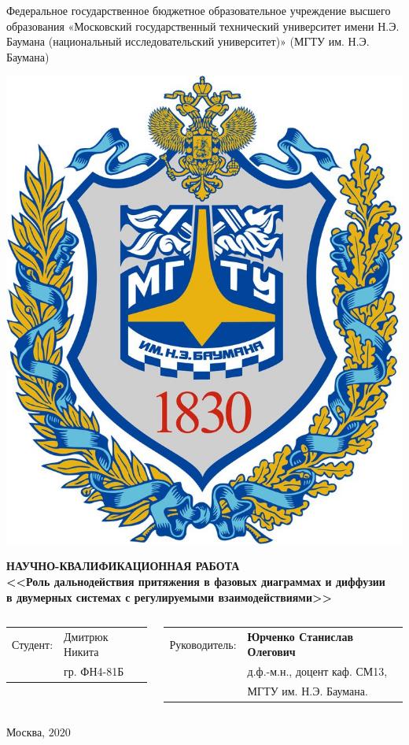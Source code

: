 \documentclass[pdf,hyperref={unicode}]{beamer}
\begin{document}

\begin{frame}
	\begin{center}\tiny
		Федеральное государственное бюджетное образовательное учреждение высшего образования «Московский государственный технический университет имени Н.Э. Баумана (национальный исследовательский университет)» (МГТУ им. Н.Э. Баумана)\\
    \end{center}

	\begin{center}
		\includegraphics[width=0.15\linewidth]{emb}
	\end{center}

	\begin{center}
\tiny \textbf{НАУЧНО-КВАЛИФИКАЦИОННАЯ РАБОТА}\\
\tiny \textbf{<<Роль дальнодействия притяжения в фазовых диаграммах и диффузии\\ в двумерных системах с регулируемыми взаимодействиями>>}
\end{center}

	\vspace{0.5cm}
	
	\begin{columns}[T,onlytextwidth]
                \begin{column}{0.50\textwidth}
                        \begin{tabular}{ll}
        \tiny Студент:  & \tiny Дмитрюк Никита     \\
                   & \tiny гр. ФН4-81Б \\

    \end{tabular}
                \end{column}
                \begin{column}{0.50\textwidth}
                        \begin{tabular}{ll}
        \tiny Руководитель:  & \tiny \textbf{Юрченко Станислав Олегович} \\
& \tiny д.ф.-м.н., доцент каф. СМ13, \\	
 & \tiny МГТУ им. Н.Э. Баумана.
    \end{tabular}
                \end{column}
        \end{columns}
        
    
\vfill
\begin{center}
\tiny Москва, $2020$
\end{center}
\end{frame}
\end{document}
